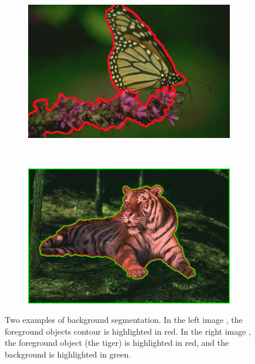 \begin{figure}[htbp]
	\centering
    \begin{subfigure}[l]{0.49\textwidth}
        \centering
    	\includegraphics[width=\textwidth]
    	{figures/Background-segmentation-01.png}
        \end{subfigure}
        ~
        \begin{subfigure}[r]{0.49\textwidth}
	        \centering
    		\includegraphics[width=\textwidth]
    		{figures/Background-segmentation-02.jpg}
		\end{subfigure} 
    \caption[Two examples of background segmentation.]
    {Two examples of background segmentation. In the left image \cite{ren2013image}, the foreground objects contour is highlighted in red. In the right image \cite{nieuwenhuis-cremers-pami12_2}, the foreground object (the tiger) is highlighted in red, and the background is highlighted in green.}
    \label{fig:generic_garment_segmentation}
\end{figure}


